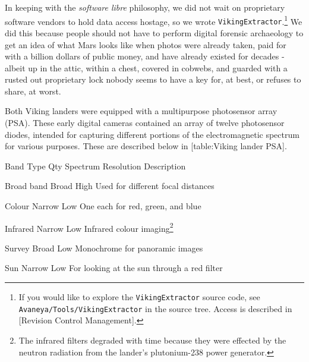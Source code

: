 
In keeping with the {\it software libre} philosophy, we did not wait on proprietary software vendors to hold data access hostage, so we wrote {\tt VikingExtractor}.\footnote{If you would like to explore the {\tt VikingExtractor} source code, see {\tt Avaneya/Tools/VikingExtractor} in the source tree. Access is described in [Revision Control Management].} We did this because people should not have to perform digital forensic archaeology to get an idea of what Mars looks like when photos were already taken, paid for with a billion dollars of public money, and have already existed for decades - albeit up in the attic, within a chest, covered in cobwebs, and guarded with a rusted out proprietary lock nobody seems to have a key for, at best, or refuses to share, at worst.

    {}

Both Viking landers were equipped with a multipurpose photosensor array (PSA). These early digital cameras contained an array of twelve photosensor diodes, intended for capturing different portions of the electromagnetic spectrum for various purposes. These are described below in [table:Viking lander PSA].

{
    \bTABLE[split=repeat,option=stretch]
    \setupTABLE[column][5]
        [width=.43\textwidth,
        align=yes]
    \setupTABLE[row][each][align=center]
    \setupTABLE[4][1][align=center]

\bTABLEhead
    \bTR[bottomframe=on]
      \bTH  Band Type \eTH
      \bTH  Qty \eTH
      \bTH  Spectrum \eTH
      \bTH  Resolution \eTH
      \bTH  Description \eTH
    \eTR
\eTABLEhead

\bTABLEbody
    \bTR
      \bTC Broad band \eTC
       \eTC
      \bTC Broad \eTC
      \bTC High \eTC
      \bTC Used for different focal distances \eTC
    \eTR

    \bTR
      \bTC Colour \eTC
       \eTC
      \bTC Narrow \eTC
      \bTC Low \eTC
      \bTC One each for red, green, and blue \eTC
    \eTR

    \bTR
      \bTC Infrared \eTC
       \eTC
      \bTC Narrow \eTC
      \bTC Low \eTC
      \bTC Infrared colour imaging\footnote{The infrared filters degraded with time because they were effected by the neutron radiation from the lander's plutonium-238 power generator.} \eTC
    \eTR

    \bTR
      \bTC Survey \eTC
       \eTC
      \bTC Broad \eTC
      \bTC Low \eTC
      \bTC Monochrome for panoramic images \eTC
    \eTR
    
    \bTR
      \bTC Sun \eTC
       \eTC
      \bTC Narrow \eTC
      \bTC Low \eTC
      \bTC For looking at the sun through a red filter \eTC
    \eTR

\eTABLEbody

\eTABLE
}

